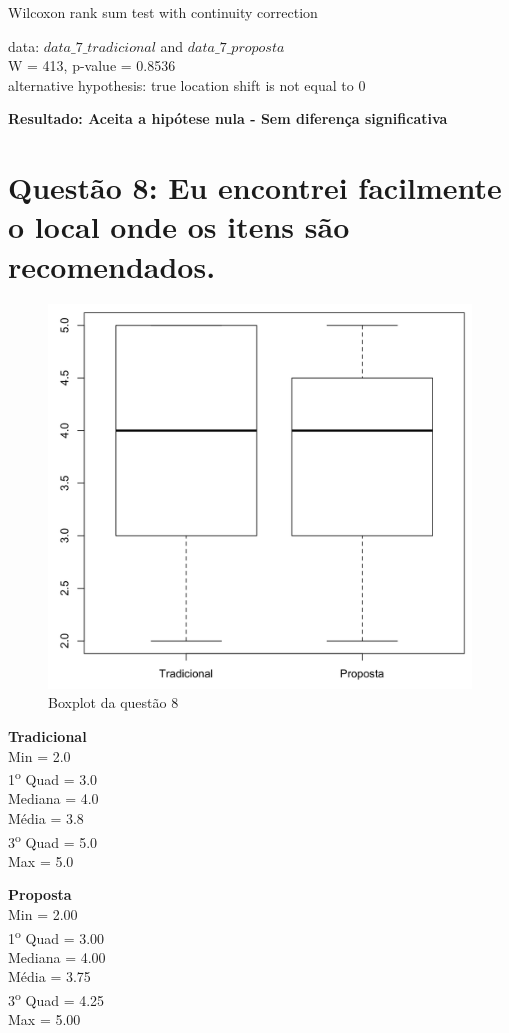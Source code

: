 Wilcoxon rank sum test with continuity correction

\noindent
data:  $data\_7\_tradicional$ and $data\_7\_proposta$\\
W = 413, p-value = 0.8536\\
alternative hypothesis: true location shift is not equal to 0

\noindent
\textbf{Resultado: Aceita a hipótese nula - Sem diferença significativa}

\newpage
\section{Questão 8: Eu encontrei facilmente o local onde os itens são recomendados.}

\begin{figure}[htb]
  \caption{\label{fig:questao8-boxplot}Boxplot da questão 8}
  \begin{center}
      \includegraphics[scale=0.4]{./Figuras/questao8-boxplot.png}
  \end{center}
\end{figure}

\begin{multicols}{2}

\noindent\textbf{Tradicional}\\
Min = 2.0\\
1\textsuperscript{o} Quad = 3.0\\
Mediana = 4.0\\
Média = 3.8\\
3\textsuperscript{o} Quad = 5.0\\
Max = 5.0\\
\columnbreak

\noindent\textbf{Proposta}\\
Min = 2.00\\
1\textsuperscript{o} Quad = 3.00\\
Mediana = 4.00\\
Média = 3.75\\
3\textsuperscript{o} Quad = 4.25\\
Max = 5.00
\end{multicols}

